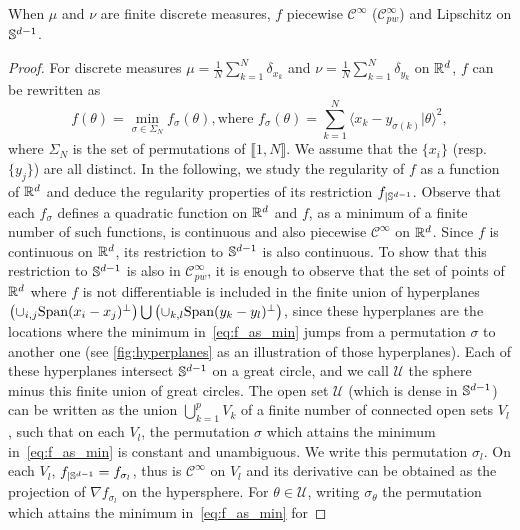 \begin{Prop}
When $\mu$ and $\nu$ are finite discrete measures, $f$ piecewise $\mathcal{C}^{\infty}$
($\mathcal{C}_{pw}^{\infty}$) and Lipschitz on $\mathbb{S}^{d-1}$. 
 \end{Prop}
\begin{proof}
For discrete measures  $\mu =
\frac{1}{N}\sum\limits_{k=1}^N \delta_{x_k}$ and  $\nu =
\frac{1}{N}\sum\limits_{k=1}^N \delta_{y_k}$ on $\mathbb{R}^{d}$, $f$ can be
  rewritten as 
  \begin{equation}
f(\theta) = \min_{\sigma \in \Sigma_N} f_{\sigma}(\theta), \text{
    where } f_{\sigma}(\theta) = \sum_{k=1}^N \langle
  x_k-y_{\sigma(k)} | \theta \rangle ^2,\label{eq:f_as_min}
\end{equation}
where $\Sigma_N$ is the set of permutations of $\llbracket 1,N\rrbracket$.
We assume that the $\{x_i\}$ (resp. $\{y_j\}$) are all distinct. 
In the following, we study the regularity of $f$ as a function of
$\mathbb{R}^d$ and deduce the regularity properties of its restriction
$f_{|\mathbb{S}^{d-1}}$. 
Observe that each $f_{\sigma}$ defines a quadratic function on $\mathbb{R}^d$
and $f$, as a
minimum of a finite number of such functions, is continuous 
and also piecewise  $\mathcal{C}^{\infty}$ on $\mathbb{R}^d$. Since $f$ is
continuous on $\mathbb{R}^d$, its restriction to $\mathbb{S}^{d-1}$ is also continuous. To show that this restriction to $\mathbb{S}^{d-1}$ is also in
$\mathcal{C}_{pw}^{\infty}$, it is enough to observe that the set of
points of $\mathbb{R}^d$ where $f$ is not differentiable is included in the
finite union of hyperplanes
$\left(\cup_{i,j} \text{Span}(x_i - x_j)^{\perp} \right)\bigcup \left(\cup_{k,l}\text{Span}(y_k -
y_l)^{\perp}\right)$, since these {hyperplanes} are the locations where the
minimum in~\autoref{eq:f_as_min} jumps from a permutation $\sigma$ to
another one (see \autoref{fig:hyperplanes} as an illustration of those hyperplanes). Each of these
hyperplanes intersect $\mathbb{S}^{d-1}$ on a great circle, and we call $\mathcal{U}$ 
the sphere minus this finite union of great circles. The open set
$\mathcal{U}$ (which is dense in $\mathbb{S}^{d-1}$) can be written as the union $\bigcup_{k=1}^p V_k$ of a finite number of
connected open sets $V_l$, such that on each $V_l$, the permutation
$\sigma$ which attains the minimum in~\autoref{eq:f_as_min}  is
constant and unambiguous. We write this permutation $\sigma_l$. On
each $V_l$, $f_{|\mathbb{S}^{d-1}} = {f_{\sigma_l}}$, thus is  
$\mathcal{C}^{\infty}$ on $V_l$ and its derivative can be
obtained as the projection of  $\nabla f_{\sigma_l}$ on the
hypersphere. For $\theta \in \mathcal{U}$, writing $\sigma_{\theta}$
the permutation which attains the minimum in~\autoref{eq:f_as_min}  for

\end{proof}
